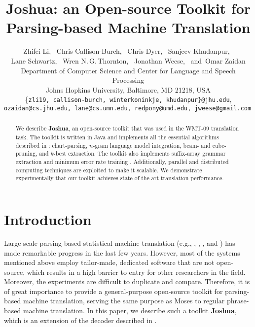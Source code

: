 \documentclass[11pt]{article}
\title{Joshua: an Open-source Toolkit for Parsing-based Machine Translation}
\author{
Zhifei Li,\,\,\,
Chris Callison-Burch,\,\,\, %
Chris Dyer,\,\,\,
Sanjeev Khudanpur,\,\,\, \\
Lane Schwartz,\,\,\,
Wren N.\,G.\,Thornton,\,\,\,
Jonathan Weese,\,\,\,
{\textnormal{ and}}\,\,\,Omar Zaidan\\
Department of Computer Science and Center for Language and Speech Processing\\
Johns Hopkins University, Baltimore, MD 21218, USA\\
{\{\tt zli19, callison-burch, winterkoninkje, khudanpur\}@jhu.edu}, \\\tt {ozaidan@cs.jhu.edu, lane@cs.umn.edu, redpony@umd.edu, jweese@gmail.com} }
\date{}
\begin{document}
\setlength{\pdfpageheight}{\paperheight}
\setlength{\pdfpagewidth}{\paperwidth}

\maketitle
\begin{abstract}
We describe \textbf{Joshua}, an open-source toolkit that was used in the WMT-09 translation task. The toolkit is written in Java and implements all the essential algorithms described in : chart-parsing, $n$-gram language model integration, beam- and cube-pruning, and $k$-best extraction. The toolkit also implements suffix-array grammar extraction \cite{adam-suffix} and minimum error rate training \cite{discriminative-mert}. Additionally, parallel and distributed computing techniques are exploited to make it scalable. We demonstrate experimentally that our toolkit achieves state of the art translation performance.

\end{abstract}


\section{Introduction}
Large-scale parsing-based statistical machine translation (e.g., , , , and ) has made remarkable progress in the last few years.
However, most of the systems mentioned above employ tailor-made, dedicated software that are not open-source, which results in a high barrier to entry for other researchers in the field. Moreover, the experiments are difficult to duplicate and compare.
Therefore, it is of great importance to provide a general-purpose open-source toolkit for parsing-based machine translation, serving the same purpose as Moses \cite{moses} to regular phrase-based machine translation. In this paper, we describe such a toolkit \textbf{Joshua}, which is an extension of the decoder described in .
\end{document}
